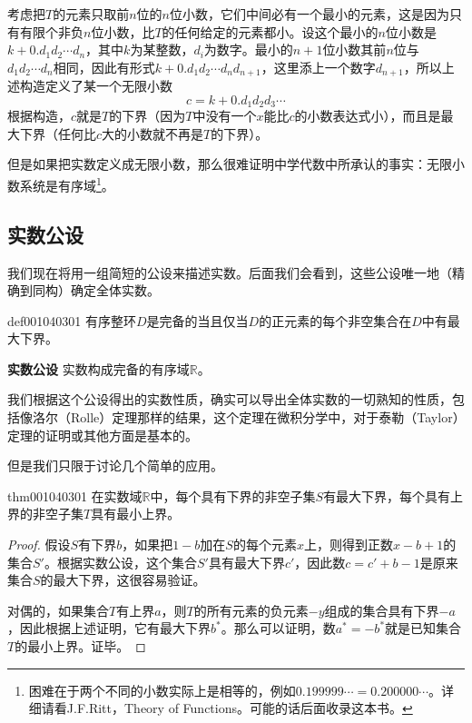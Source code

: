 考虑把$T$的元素只取前$n$位的$n$位小数，它们中间必有一个最小的元素，这是因为只有有限个非负$n$位小数，比$T$的任何给定的元素都小。设这个最小的$n$位小数是$k+0.d_1d_2\cdots{}d_n$，其中$k$为某整数，$d_i$为数字。最小的$n+1$位小数其前$n$位与$d_1d_2\cdots{}d_n$相同，因此有形式$k+0.d_1d_2\cdots{}d_nd_{n+1}$，这里添上一个数字$d_{n+1}$，所以上述构造定义了某一个无限小数
\[
c = k + 0.d_1d_2d_3\cdots
\]
根据构造，$c$就是$T$的下界（因为$T$中没有一个$x$能比$c$的小数表达式小），而且是最大下界（任何比$c$大的小数就不再是$T$的下界）。

但是如果把实数定义成无限小数，那么很难证明中学代数中所承认的事实：无限小数系统是有序域\footnote{困难在于两个不同的小数实际上是相等的，例如$0.199999\cdots=0.200000\cdots$。详细请看J.F.Ritt，Theory of Functions。可能的话后面收录这本书。}。



\subsection{实数公设}\label{subsection0010403}
我们现在将用一组简短的公设来描述实数。后面我们会看到，这些公设唯一地（精确到同构）确定全体实数。

\begin{definition}{}{def001040301}
有序整环$D$是完备的当且仅当$D$的正元素的每个非空集合在$D$中有最大下界。
\end{definition}

\textbf{实数公设} \quad 实数构成完备的有序域$\mathbb{R}$。

我们根据这个公设得出的实数性质，确实可以导出全体实数的一切熟知的性质，包括像洛尔（Rolle）定理那样的结果，这个定理在微积分学中，对于泰勒（Taylor）定理的证明或其他方面是基本的。

但是我们只限于讨论几个简单的应用。
\begin{theorem}{}{thm001040301}
在实数域$\mathbb{R}$中，每个具有下界的非空子集$S$有最大下界，每个具有上界的非空子集$T$具有最小上界。
\end{theorem}

\begin{proof}
假设$S$有下界$b$，如果把$1-b$加在$S$的每个元素$x$上，则得到正数$x-b+1$的集合$S'$。根据实数公设，这个集合$S'$具有最大下界$c'$，因此数$c=c'+b-1$是原来集合$S$的最大下界，这很容易验证。

对偶的，如果集合$T$有上界$a$，则$T$的所有元素的负元素$-y$组成的集合具有下界$-a$，因此根据上述证明，它有最大下界$b^*$。那么可以证明，数$a^*=-b^*$就是已知集合$T$的最小上界。证毕。
\end{proof}

